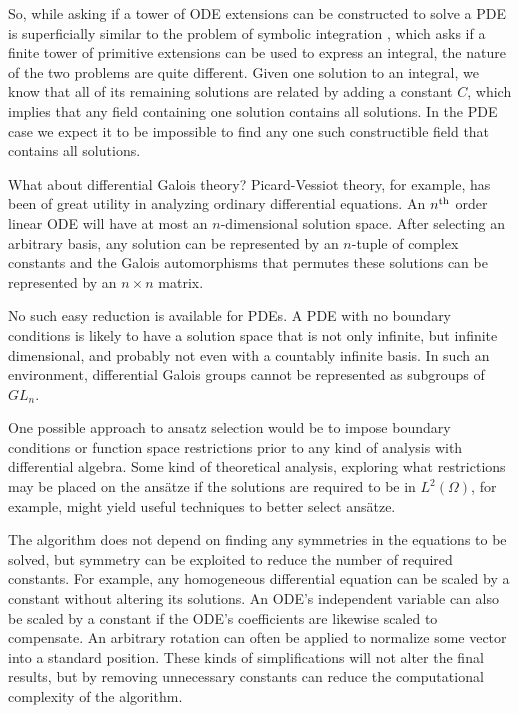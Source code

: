 \documentclass{article}
\theoremstyle{definition}
\theoremstyle{plain}
\begin{document}
So, while asking if a tower of ODE extensions can be constructed to solve a PDE is superficially similar to the problem of symbolic integration
\cite{Bronstein},
which asks if a finite tower of primitive extensions can be used to express an integral,
the nature of the two problems are quite different.
Given one solution to an integral, we know that all of its remaining solutions
are related by adding a constant $C$, which implies that any field containing one solution contains all solutions.
In the PDE case we expect it to be impossible to find any one such constructible field that contains all solutions.

What about differential Galois theory?
Picard-Vessiot theory, for example, has been of great utility in analyzing ordinary differential equations.
An $n^{\rm th}$ order linear ODE will have at most an $n$-dimensional
solution space.  After selecting an arbitrary basis, any
solution can be represented by an $n$-tuple of complex constants and
the Galois automorphisms that permutes these solutions can be represented by
an $n \times n$ matrix.

No such easy reduction is available for PDEs.
A PDE with no boundary conditions
is likely to have a solution space that is not only infinite, but infinite
dimensional, and probably not even with a countably infinite basis.
In such an environment, differential Galois groups
cannot be represented as subgroups of $GL_n$.


One possible approach to ansatz selection would be to impose boundary
conditions or function space restrictions prior to any kind of analysis with differential algebra.
Some kind of theoretical analysis, exploring what restrictions may be placed
on the ans\"atze if the solutions are required to be in $L^2(\Omega)$, for example, might yield
useful techniques to better select ans\"atze.

The algorithm does not depend on finding any symmetries in the equations to be solved,
but symmetry can be exploited to reduce the number of required constants.
For example, any homogeneous differential equation
can be scaled by a constant without altering its solutions.  An ODE's
independent variable can also be scaled by a constant if the ODE's coefficients are
likewise scaled to compensate.  An arbitrary rotation can often be applied
to normalize some vector into a standard position.  These kinds of simplifications
will not alter the final results, but by removing unnecessary constants can
reduce the computational complexity of the algorithm.
\end{document}
